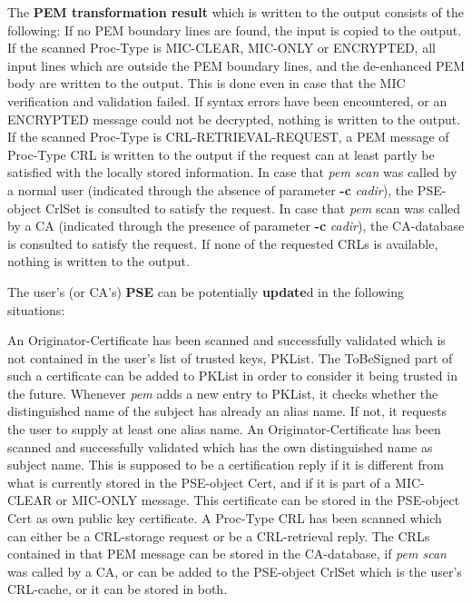 The {\bf PEM transformation result} which is written to the output consists of the
following:
\bi
\m If no PEM boundary lines are found, the input is copied to the output.
\m If the scanned Proc-Type is MIC-CLEAR, MIC-ONLY or ENCRYPTED, all input lines which are 
   outside the PEM boundary lines, and the de-enhanced PEM body are written to the output. 
   This is done even in case that the MIC verification and validation failed. If
   syntax errors have been encountered, or an ENCRYPTED message could not be decrypted,
   nothing is written to the output.
\m If the scanned Proc-Type is CRL-RETRIEVAL-REQUEST, a PEM message of Proc-Type CRL is written
   to the output if the request can at least partly be satisfied with the locally stored 
   information. In case that {\em pem scan} was called by a normal user (indicated through the
   absence of parameter {\bf -c} {\em cadir}), the PSE-object CrlSet is consulted to
   satisfy the request. In case that {\em pem} scan was called by a CA (indicated through the
   presence of parameter {\bf -c} {\em cadir}), the CA-database is consulted to
   satisfy the request. If none of the requested CRLs is available, nothing is written
   to the output.
\ei

The user's (or CA's) {\bf PSE} can be potentially {\bf update}d in the following situations:

\bi
\m An Originator-Certificate has been scanned and successfully validated which is not
   contained in the user's list of trusted keys, PKList. The ToBeSigned part of such
   a certificate can be added to PKList in order to consider it being trusted in the future.
   Whenever {\em pem} adds a new entry to PKList, it checks whether the distinguished
   name of the subject has already an alias name. If not, it requests the user to
   supply at least one alias name.  
\m An Originator-Certificate has been scanned and successfully validated which has the
   own distinguished name as subject name. This is supposed to be a certification reply
   if it is different from what is currently stored in the PSE-object Cert, and if it
   is part of a MIC-CLEAR or MIC-ONLY message. This certificate can be stored in the
   PSE-object Cert as own public key certificate.
\m A Proc-Type CRL has been scanned which can either be a CRL-storage request or be a
   CRL-retrieval reply. The CRLs contained in that PEM message can be stored in the CA-database,
   if {\em pem scan} was called by a CA, or can be added to the PSE-object CrlSet which is the
   user's CRL-cache, or it can be stored in both.
\ei

